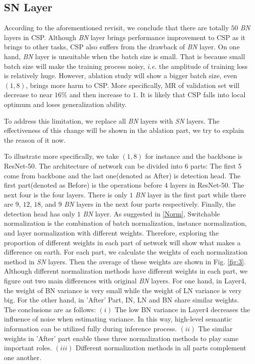 \documentclass[twocolumn]{article}
\begin{document}
\subsection{SN Layer}\label{SN}
According to the aforementioned revisit, we conclude that there are totally $50$ \textit{BN} layers in CSP\cite{liu2019high}. Although  \textit{BN} layer brings performance improvement to CSP\cite{liu2019high} as it brings to other tasks,  CSP\cite{liu2019high} also suffers from the drawback of  \textit{BN} layer. On one hand, \textit{BN} layer is unsuitable when the batch size is small. That is because small batch size will make the training process noisy, \textit{i.e.} the amplitude of training loss is relatively huge. However, ablation study will show a bigger batch size, even $(1,8)$, brings more harm to CSP\cite{liu2019high}. More specifically, MR of validation set will decrease to near $16\%$ and then increase to $1$. It is likely that CSP\cite{liu2019high} falls into local optimum and loses generalization ability.\par 
To address this limitation, we replace all \textit{BN} layers with \textit{SN} layers. The effectiveness of this change will be shown in the ablation part, we try to explain the reason of it now.\par To illustrate more specifically, we take $(1,8)$ for instance and the backbone is ResNet-50. The architecture of network can be divided into $6$ parts: The first $5$ come from backbone and the last one(denoted as After) is detection head. The first part(denoted as Before) is the operations before $4$ layers in ResNet-50. The next four is the four layers. There is only $1$ \textit{BN} layer in the first part while there are $9$, $12$, $18$, and $9$ \textit{BN} layers in the next four parts respectively. Finally, the detection head has only $1$ \textit{BN} layer. As suggested in \ref{Norm}, Switchable normalization is the combination of batch normalization, instance normalization, and layer normalization with different weights. Therefore, exploring the proportion of different weights in each part of network will show what makes a difference on earth. For each part, we calculate the weights of each normalization method in \textit{SN} layers. Then the average of these weights are shown in Fig. \ref{fig:3}. Although different normalization methods have different weights in each part, we figure out two main differences with original \textit{BN} layers. For one hand, in Layer4, the weight of BN variance is very small while the weight of LN variance is very big. For the other hand, in 'After' Part, IN, LN and BN share similar weights. The conclusions are as follows: $(i)$ The low BN variance in Layer4 decreases the influence of noise when estimating variance. In this way, high-level semantic information can be utilized fully during inference process. $(ii)$ The similar weights in 'After' part enable these three normalization methods to play same important roles. $(iii)$ Different normalization methods in all parts complement one another.
\end{document}
